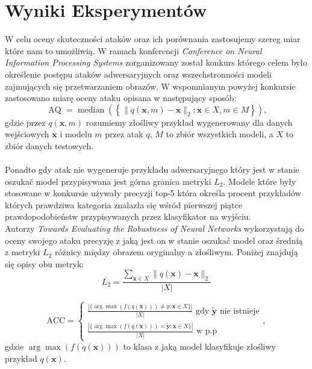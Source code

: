\documentclass[
    left=2.5cm,         %
    right=2.5cm,        %
    top=2.5cm,          %
    bottom=3cm,         %
    bindingoffset=6mm,  %
    nohyphenation=false %
]{eiti/eiti-thesis}
\renewcommand{\vec}[1]{\mathbf{#1}}
\begin{document}
\section{Wyniki Eksperymentów}\label{comparison}
    W celu oceny skuteczności ataków oraz ich porównania zastosujemy szereg miar które nam to umożliwią.
    W ramach konferencji
    \textit{Conference on Neural Information Processing Systems} zorganizowany został konkurs którego celem było
    określenie postępu ataków adwersaryjnych oraz wszechstronności modeli zajmujących się przetwarzaniem obrazów\cite{DBLP:journals/corr/abs-1808-01976}.
    W wspomnianym powyżej konkursie zastosowano miarę oceny ataku opisana w następujący sposób:
    \begin{equation}\label{nips_median}
        \text { AQ }=\operatorname{median}\left(\left\{\|q{(\vec{x}, m)} - \vec{x} \|_2 : \vec{x} \in X, m \in M\right\}\right),
    \end{equation}
    gdzie przez \(q(\vec{x}, m)\) rozumiemy złośliwy przykład wygenerowany dla danych wejściowych \(\vec{x}\) i modelu \(m\) przez atak \(q\),
    \(M\) to zbiór wszystkich modeli, a \(X\) to zbiór danych testowych.
    \\~\\
    Ponadto gdy atak nie wygeneruje przykładu adwersaryjnego który jest w stanie oszukać model przypisywana jest górna granica
    metryki \(L_2\).
    Modele które były stosowane w konkursie używały precyzji top-5 która określa procent przykładów których prawdziwa
    kategoria znalazła się wśród pierwszej piątce prawdopodobieństw przypisywanych przez klasyfikator na wyjściu.\\

    Autorzy \textit{Towards Evaluating the Robustness of Neural Networks}\cite{DBLP:journals/corr/CarliniW16a} wykorzystują do oceny swojego ataku precyzję z jaką jest on w stanie oszukać
    model oraz średnią z metryki \(L_2\) różnicy między obrazem oryginalny a złośliwym. Poniżej znajdują się opisy obu metryk:
    \begin{equation}
        \overline{L_2}=\frac{\sum_{\vec{x} \in X}\|q(\vec{x})-\vec{x}\|_2}{|X|}
    \end{equation}

    \begin{equation}
        \text{ACC}=\left\{
        \begin{array}{lc}
        \frac{|\{ \arg \max (f(q(\vec{x}))) \neq y : \vec{x}\in X\}|}{|X|} \text{ gdy \(\vec{\widetilde{y}}\) nie istnieje}\\
        \frac{|\{\arg \max (f(q(\vec{x}))) =\vec{\widetilde{y}} : \vec{x} \in X\}|}{|X|} \text{ w p.p}
        \end{array},
    \end{equation}
    gdzie \(\arg \max (f(q(\vec{x})))\) to klasa z jaką model klasyfikuje złośliwy przykład \(q(\vec{x})\).
    \\~\\
\end{document}
